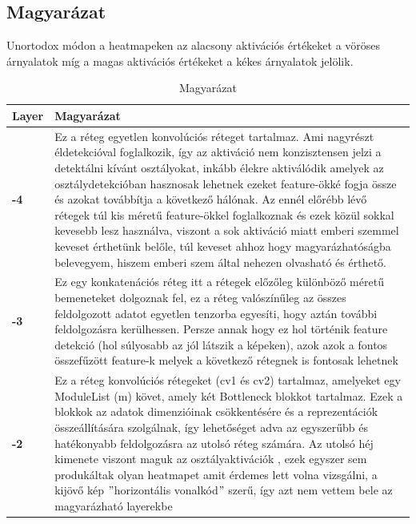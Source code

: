 \documentclass[12pt,oneside,a4paper]{article}
\theoremstyle{remark}
\begin{document}
\subsection{Magyarázat}\label{subsec:magyarazat}
Unortodox módon a heatmapeken az alacsony aktivációs értékeket a vöröses árnyalatok míg a magas aktivációs értékeket a
kékes árnyalatok jelölik.

\begin{table}[ht]
    \center
    \begin{tabularx}{\textwidth}{|p{}||X|}
        \hline
        \textbf{Layer} & Magyarázat     \\
        \hline
        \textbf{-4}    & Ez a réteg egyetlen konvolúciós réteget tartalmaz.
        Ami nagyrészt éldetekcióval foglalkozik, így az aktiváció nem konzisztensen jelzi a detektálni kívánt osztályokat,
        inkább élekre aktiválódik amelyek az osztálydetekcióban hasznosak lehetnek ezeket \gls{feature}-ökké fogja
        össze és azokat továbbítja a következő hálónak.
        Az ennél előrébb lévő rétegek túl kis méretű \gls{feature}-ökkel foglalkoznak és ezek közül sokkal kevesebb lesz használva,
        viszont a sok aktiváció miatt emberi szemmel keveset érthetünk belőle, túl keveset ahhoz hogy magyarázhatóságba belevegyem,
        hiszem emberi szem által nehezen olvasható és érthető.\\
        \hline
        \textbf{-3}    & Ez egy konkatenációs réteg itt a rétegek előzőleg különböző méretű bemeneteket dolgoznak fel, ez a
        réteg valószínűleg az összes feldolgozott adatot egyetlen tenzorba egyesíti, hogy aztán további feldolgozásra kerülhessen.
        Persze annak hogy ez hol történik \gls{feature} detekció (hol súlyosabb az jól látszik a képeken), azok azok a fontos összefűzött \gls{feature}-k
        melyek a következő rétegnek is fontosak lehetnek\\
        \hline
        \textbf{-2}    &  Ez a réteg konvolúciós rétegeket (cv1 és cv2) tartalmaz, amelyeket egy ModuleList (m) követ,
        amely két Bottleneck blokkot tartalmaz.
        Ezek a blokkok az adatok dimenzióinak csökkentésére és a reprezentációk összeállítására szolgálnak,
        így lehetőséget adva az egyszerűbb és hatékonyabb feldolgozásra az utolsó réteg számára.
        Az utolsó héj kimenete viszont maguk az osztályaktivációk , ezek egyszer sem produkáltak olyan heatmapet amit
        érdemes lett volna vizsgálni, a kijövő kép \("\)horizontális vonalkód\("\) szerű, így azt nem vettem bele az
        magyarázható layerekbe\\
        \hline
    \end{tabularx}
    \caption{Magyarázat}\label{tab:debrief}
\end{table}
\end{document}
